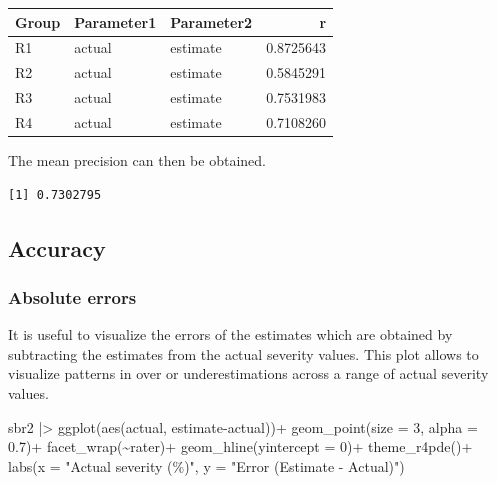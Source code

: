 \documentclass[
  letterpaper,
]{book}
\newenvironment{Shaded}{\begin{snugshade}}{\end{snugshade}}
\newcommand{\AttributeTok}[1]{\textcolor[rgb]{0.40,0.45,0.13}{#1}}
\newcommand{\DecValTok}[1]{\textcolor[rgb]{0.68,0.00,0.00}{#1}}
\newcommand{\FloatTok}[1]{\textcolor[rgb]{0.68,0.00,0.00}{#1}}
\newcommand{\FunctionTok}[1]{\textcolor[rgb]{0.28,0.35,0.67}{#1}}
\newcommand{\NormalTok}[1]{\textcolor[rgb]{0.00,0.23,0.31}{#1}}
\newcommand{\SpecialCharTok}[1]{\textcolor[rgb]{0.37,0.37,0.37}{#1}}
\newcommand{\StringTok}[1]{\textcolor[rgb]{0.13,0.47,0.30}{#1}}
\begin{document}
\begin{longtable}[]{@{}lllr@{}}
\toprule\noalign{}
Group & Parameter1 & Parameter2 & r \\
\midrule\noalign{}
\endhead
\bottomrule\noalign{}
\endlastfoot
R1 & actual & estimate & 0.8725643 \\
R2 & actual & estimate & 0.5845291 \\
R3 & actual & estimate & 0.7531983 \\
R4 & actual & estimate & 0.7108260 \\
\end{longtable}

The mean precision can then be obtained.

\begin{Shaded}
\end{Shaded}

\begin{verbatim}
[1] 0.7302795
\end{verbatim}

\hypertarget{accuracy}{%
\subsection{Accuracy}\label{accuracy}}

\hypertarget{absolute-errors}{%
\subsubsection{Absolute errors}\label{absolute-errors}}

It is useful to visualize the errors of the estimates which are obtained
by subtracting the estimates from the actual severity values. This plot
allows to visualize patterns in over or underestimations across a range
of actual severity values.

\begin{Shaded}
\begin{Highlighting}[]
\NormalTok{sbr2 }\SpecialCharTok{|\textgreater{}} 
  \FunctionTok{ggplot}\NormalTok{(}\FunctionTok{aes}\NormalTok{(actual, estimate}\SpecialCharTok{{-}}\NormalTok{actual))}\SpecialCharTok{+}
  \FunctionTok{geom\_point}\NormalTok{(}\AttributeTok{size =} \DecValTok{3}\NormalTok{, }\AttributeTok{alpha =} \FloatTok{0.7}\NormalTok{)}\SpecialCharTok{+}
  \FunctionTok{facet\_wrap}\NormalTok{(}\SpecialCharTok{\textasciitilde{}}\NormalTok{rater)}\SpecialCharTok{+}
  \FunctionTok{geom\_hline}\NormalTok{(}\AttributeTok{yintercept =} \DecValTok{0}\NormalTok{)}\SpecialCharTok{+}
  \FunctionTok{theme\_r4pde}\NormalTok{()}\SpecialCharTok{+}
  \FunctionTok{labs}\NormalTok{(}\AttributeTok{x =} \StringTok{"Actual severity (\%)"}\NormalTok{,}
       \AttributeTok{y =} \StringTok{"Error (Estimate {-} Actual)"}\NormalTok{)}
\end{Highlighting}
\end{Shaded}
\end{document}

